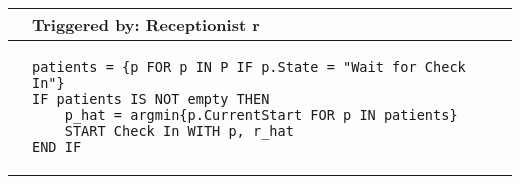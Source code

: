 \begin{tabular}{@{}>{\raggedright\arraybackslash}p{0.25cm}>{\raggedright\arraybackslash}p{13cm}@{}}
  \toprule
   & Triggered by: Receptionist r\\ \midrule 
  &
\vspace{-12pt}
\begin{lstlisting}[language=CMPseudo]
patients = {p FOR p IN P IF p.State = "Wait for Check In"}
IF patients IS NOT empty THEN 
    p_hat = argmin{p.CurrentStart FOR p IN patients}
    START Check In WITH p, r_hat
END IF
  \end{lstlisting}  
  \\[-12pt] \bottomrule
  \end{tabular}